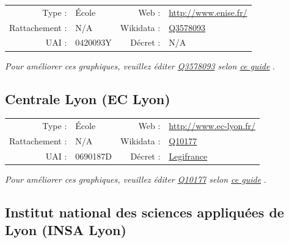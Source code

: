 \documentclass[11pt,french,landscape]{article}
\begin{document}
\begin{tabular*}{0.45\textwidth}{rp{2cm}rl}  
\hline  
Type : & École & Web : &\href{http://www.enise.fr/}{http://www.enise.fr/} \\  
Rattachement : & N/A & Wikidata : & \href{https://www.wikidata.org/entity/Q3578093}{Q3578093} \\  
UAI : & 0420093Y & Décret : & N/A \\  
\hline  
\end{tabular*}

\textit{\scriptsize Pour améliorer ces graphiques, veuillez éditer \href{https://www.wikidata.org/entity/Q3578093}{Q3578093}  selon \href{https://github.com/cpesr/wikidataESR/blob/master/Rmd/wikidataESR.md}{ce guide}}
.


\newpage

\hypertarget{centrale-lyon-ec-lyon}{%
\subsection{Centrale Lyon (EC Lyon)}\label{centrale-lyon-ec-lyon}}

\begin{tabular*}{0.45\textwidth}{rp{2cm}rl}  
\hline  
Type : & École & Web : &\href{http://www.ec-lyon.fr/}{http://www.ec-lyon.fr/} \\  
Rattachement : & N/A & Wikidata : & \href{https://www.wikidata.org/entity/Q10177}{Q10177} \\  
UAI : & 0690187D & Décret : & \href{http://www.legifrance.gouv.fr/affichTexte.do?dateTexte=&categorieLien=id&cidTexte=JORFTEXT000026512132&fastPos=1&fastReqId=2009709206&oldAction=rechExpTexteJorf}{Legifrance} \\  
\hline  
\end{tabular*}

\textit{\scriptsize Pour améliorer ces graphiques, veuillez éditer \href{https://www.wikidata.org/entity/Q10177}{Q10177}  selon \href{https://github.com/cpesr/wikidataESR/blob/master/Rmd/wikidataESR.md}{ce guide}}
.


\newpage

\hypertarget{institut-national-des-sciences-appliquuxe9es-de-lyon-insa-lyon}{%
\subsection{Institut national des sciences appliquées de Lyon (INSA
Lyon)}\label{institut-national-des-sciences-appliquuxe9es-de-lyon-insa-lyon}}
\end{document}
